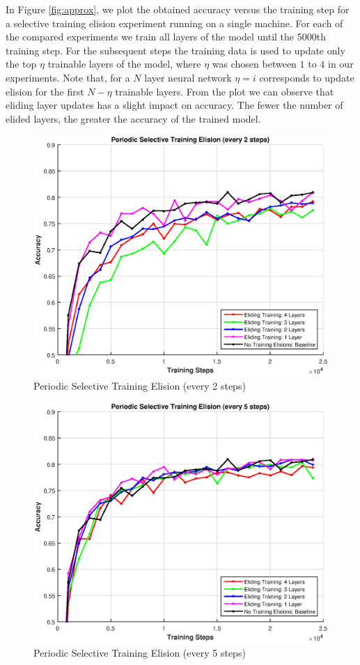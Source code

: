 In Figure \ref{fig:approx}, we plot the obtained accuracy versus the training step for a selective training elision experiment running on a single machine. For each of the compared experiments we train all layers of the model until the 5000th training step. For the subsequent steps the training data is used to update only the top $\eta$ trainable layers of the model, where $\eta$ was chosen between $1$ to $4$ in our experiments. Note that, for a $N$ layer neural network $\eta=i$ corresponds to update elision for the first $N-\eta$ trainable layers. From the plot we can observe that eliding layer updates has a slight impact on accuracy. The fewer the number of elided layers, the greater the accuracy of the trained model. 

\begin{figure}[t]
	\centering
	\includegraphics[width=0.8\columnwidth]{figures/periodic-approx-2.eps}
	\caption{Periodic Selective Training Elision (every 2 steps)}
	\label{fig:periodic-approx-2}
\end{figure}
\begin{figure}[t]
	\centering
	\includegraphics[width=0.8\columnwidth]{figures/periodic-approx-5.eps}
	\caption{Periodic Selective Training Elision (every 5 steps)}
	\label{fig:periodic-approx-5}
\end{figure}

